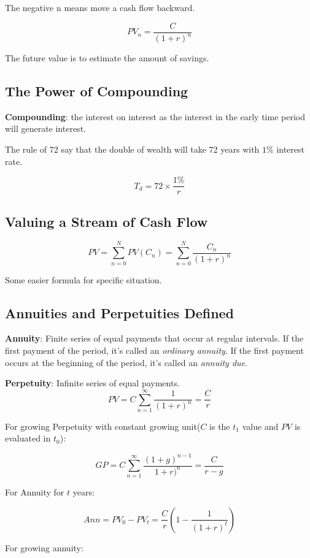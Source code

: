 \documentclass[10pt, a4paper]{article}
\begin{document}
            The negative n means move a cash flow backward. 

            $$PV_n = \frac{C}{(1 + r)^n}$$

            The future value is to estimate the amount of savings. 
        \subsection{The Power of Compounding}
           \textbf{Compounding}: the interest on interest as the interest in the early time period will generate interest. 

            The rule of 72 say that the double of wealth will take 72 years with $1\%$ interest rate. 

            $$T_d = 72 \times \frac{1\%}{r}$$

        \subsection{Valuing a Stream of Cash Flow}
        
        $$PV = \sum_{n = 0}^{N}PV(C_n) = \sum_{n = 0}^{N}\frac{C_n}{(1 + r)^n}$$

        Some easier formula for specific situation. 

        \subsection{Annuities and Perpetuities Defined}
        
        \textbf{Annuity}: Finite series of equal payments that occur at regular intervals. If the first payment of the period, it's called an \emph{ordinary annuity}. If the first payment occurs at the beginning of the period, it's called an \emph{annuity due}. 

        \textbf{Perpetuity}: Infinite series of equal payments.
        $$PV = C\sum_{n = 1}^{\infty}\frac{1}{(1 + r)^n} = \frac{C}{r}$$

        For growing Perpetuity with constant growing unit($C$ is the $t_1$ value and $PV$ is evaluated in $t_0$): 

        $$GP = C\sum_{n = 1}^{\infty}\frac{(1 + g)^{n - 1}}{{1 + r)^n}} = \frac{C}{r - g}$$

        For Annuity for $t$ years:

        $$Ann = PV_{0} - PV_{t} = \frac{C}{r}( 1 - \frac{1}{(1 + r)^t})$$

        For growing annuity:
\end{document}
